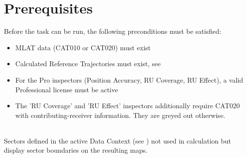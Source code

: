 \section{Prerequisites}
\label{sec:analyze_prereqs}

Before the task can be run, the following preconditions must be satisfied: \\

\begin{itemize}
\item MLAT data (CAT010 or CAT020) must exist
\item Calculated Reference Trajectories must exist, see 
\item For the Pro inspectors (Position Accuracy, RU Coverage, RU Effect), a valid Professional license must be active
\item The 'RU Coverage' and 'RU Effect' inspectors additionally require CAT020 with contributing-receiver information. They are greyed out otherwise.
\end{itemize}
\ \\

Sectors defined in the active Data Context (see ) not used in calculation but display sector boundaries on the resulting maps. \\
